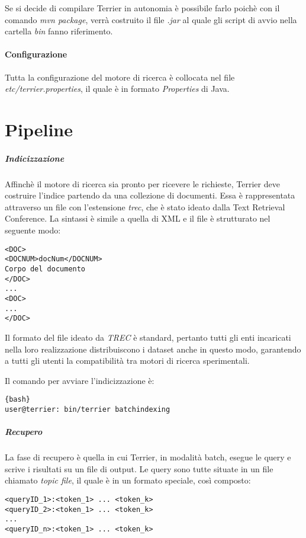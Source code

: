 Se si decide di compilare Terrier in autonomia è possibile farlo poichè con il comando \textit{mvn package},
verrà costruito il file \textit{.jar} al quale gli script di avvio nella cartella \textit{bin} fanno riferimento.

\paragraph{Configurazione}
Tutta la configurazione del motore di ricerca è collocata nel file \textit{etc/terrier.properties}, il quale
è in formato \textit{Properties} di Java.

\section{Pipeline}
\subparagraph{Indicizzazione} Affinchè il motore di ricerca sia pronto per ricevere le richieste,
Terrier deve costruire l'indice partendo da una collezione di documenti.
Essa è rappresentata attraverso un file con l'estensione \textit{trec},
che è stato ideato dalla Text Retrieval Conference.
La sintassi è simile a quella di XML e il file è strutturato nel seguente modo:

\begin{lstlisting}
<DOC>
<DOCNUM>docNum</DOCNUM>
Corpo del documento
</DOC>
...
<DOC>
...
</DOC>
\end{lstlisting}

Il formato del file ideato da \textit{TREC} è standard, pertanto tutti gli enti incaricati
nella loro realizzazione distribuiscono i dataset anche in questo
modo, garantendo a tutti gli utenti la compatibilità tra motori
di ricerca sperimentali.

Il comando per avviare l'indicizzazione è:

\begin{lstlisting}{bash}
user@terrier: bin/terrier batchindexing
\end{lstlisting}

\pagebreak

\subparagraph{Recupero}
La fase di recupero è quella in cui Terrier, in modalità batch, esegue le query
e scrive i risultati su un file di output.
Le query sono tutte situate in un file chiamato \textit{topic file}, il quale
è in un formato speciale, così composto:
\begin{lstlisting}
<queryID_1>:<token_1> ... <token_k>
<queryID_2>:<token_1> ... <token_k>
...
<queryID_n>:<token_1> ... <token_k>
\end{lstlisting}

